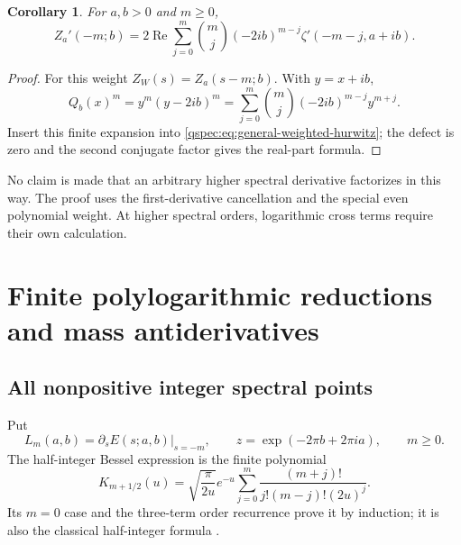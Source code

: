 \documentclass[11pt,letterpaper]{article}
\numberwithin{equation}{section}
\newtheorem{corollary}[theorem]{Corollary}
\theoremstyle{definition}
\newcommand{\Rea}{\operatorname{Re}}
\begin{document}
\begin{corollary}\label{qspec:cor:negative-hurwitz}
For $a,b>0$ and $m\ge0$,
\begin{equation}\label{qspec:eq:negative-hurwitz}
Z_a'(-m;b)=2\Rea\sum_{j=0}^m
\binom mj(-2ib)^{m-j}\zeta'(-m-j,a+ib).
\end{equation}
\end{corollary}
\begin{proof}
For this weight $Z_W(s)=Z_a(s-m;b)$. With $y=x+ib$,
\[
Q_b(x)^m=y^m(y-2ib)^m
=\sum_{j=0}^m\binom mj(-2ib)^{m-j}y^{m+j}.
\]
Insert this finite expansion into
\eqref{qspec:eq:general-weighted-hurwitz}; the defect is zero and the
second conjugate factor gives the real-part formula.
\end{proof}
No claim is made that an arbitrary higher spectral derivative factorizes
in this way. The proof uses the first-derivative cancellation and the
special even polynomial weight. At higher spectral orders, logarithmic
cross terms require their own calculation.


\section{Finite polylogarithmic reductions and mass antiderivatives}
\label{qspec:sec:finite}

\subsection{All nonpositive integer spectral points}
Put
\begin{equation}\label{qspec:eq:Lm}
L_m(a,b)=\left.\partial_s E(s;a,b)\right|_{s=-m},\qquad
z=\exp(-2\pi b+2\pi ia),\qquad m\ge0.
\end{equation}
The half-integer Bessel expression is the finite polynomial
\begin{equation}\label{qspec:eq:half-integer-K}
K_{m+1/2}(u)=\sqrt{\frac\pi{2u}}e^{-u}
\sum_{j=0}^m\frac{(m+j)!}{j!(m-j)!(2u)^j}.
\end{equation}
Its $m=0$ case and the three-term order recurrence prove it by induction;
it is also the classical half-integer formula \cite{halfK}.
\end{document}
